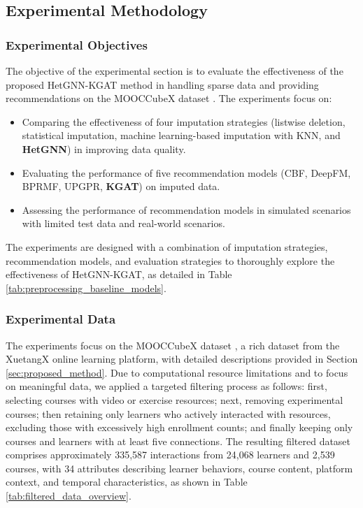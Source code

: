 \documentclass{ieeeaccess}
\begin{document}
\subsection{Experimental Methodology}

\subsubsection{Experimental Objectives}

The objective of the experimental section is to evaluate the effectiveness of the proposed HetGNN-KGAT method in handling sparse data and providing recommendations on the MOOCCubeX dataset \cite{yu2021mooccubex}. The experiments focus on:
\begin{itemize}
    \item Comparing the effectiveness of four imputation strategies (listwise deletion, statistical imputation, machine learning-based imputation with KNN, and \textbf{HetGNN}) in improving data quality.
    \item Evaluating the performance of five recommendation models (CBF, DeepFM, BPRMF, UPGPR, \textbf{KGAT}) on imputed data.
    \item Assessing the performance of recommendation models in simulated scenarios with limited test data and real-world scenarios.
\end{itemize}
The experiments are designed with a combination of imputation strategies, recommendation models, and evaluation strategies to thoroughly explore the effectiveness of HetGNN-KGAT, as detailed in Table \ref{tab:preprocessing_baseline_models}.

\subsubsection{Experimental Data}

The experiments focus on the MOOCCubeX dataset \cite{yu2021mooccubex}, a rich dataset from the XuetangX online learning platform, with detailed descriptions provided in Section \ref{sec:proposed_method}. Due to computational resource limitations and to focus on meaningful data, we applied a targeted filtering process as follows: first, selecting courses with video or exercise resources; next, removing experimental courses; then retaining only learners who actively interacted with resources, excluding those with excessively high enrollment counts; and finally keeping only courses and learners with at least five connections. The resulting filtered dataset comprises approximately 335,587 interactions from 24,068 learners and 2,539 courses, with 34 attributes describing learner behaviors, course content, platform context, and temporal characteristics, as shown in Table \ref{tab:filtered_data_overview}.
\end{document}
